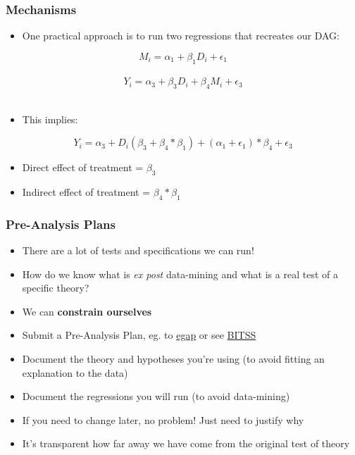 \documentclass[xcolor=x11names,compress]{beamer}\usepackage[]{graphicx}\usepackage[]{color}
\renewcommand{\(}{\begin{columns}}
\renewcommand{\)}{\end{columns}}
\newcommand{\<}[1]{\begin{column}{#1}}
\renewcommand{\>}{\end{column}}
\begin{document}
\begin{frame}
\frametitle{Mechanisms}
\begin{itemize}
\item One practical approach is to run two regressions that recreates our DAG:
\end{itemize}
$$M_i = \alpha_1 + \beta_1 D_i + \epsilon_1$$ \\
$$Y_i = \alpha_3 + \beta_3 D_i + \beta_4 M_i + \epsilon_3$$ \\
\begin{itemize}
\item This implies:
\end{itemize}
$$Y_i = \alpha_3 + D_i (\beta_3+\beta_4*\beta_1) + (\alpha_1 +\epsilon_1)*\beta_4 + \epsilon_3$$
\pause
\begin{itemize}
\item Direct effect of treatment = $\beta_3$
\pause
\item Indirect effect of treatment = $\beta_4*\beta_1$
\end{itemize}
\end{frame}

\begin{frame}
\frametitle{Pre-Analysis Plans}
\begin{itemize}
\item There are a lot of tests and specifications we can run!
\pause
\item How do we know what is \textit{ex post} data-mining and what is a real test of a specific theory?
\pause
\item We can \textbf{constrain ourselves}
\pause
\item Submit a Pre-Analysis Plan, eg. to \href{https://egap.org/content/registration}{egap} or see \href{https://www.bitss.org/resource-tag/pre-analysis-plans/}{BITSS}
\pause
\item Document the theory and hypotheses you're using (to avoid fitting an explanation to the data)
\pause
\item Document the regressions you will run (to avoid data-mining)
\pause
\item If you need to change later, no problem! Just need to justify why
\pause
\item It's transparent how far away we have come from the original test of theory
\end{itemize}
\end{frame}
\end{document}
